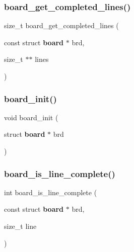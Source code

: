 \mbox{\label{board_8c_a7e412d165de7cbf6c668a1e8202bb15a}} 
\subsubsection{board\+\_\+get\+\_\+completed\+\_\+lines()}
{\footnotesize\ttfamily size\+\_\+t board\+\_\+get\+\_\+completed\+\_\+lines (\begin{DoxyParamCaption}\item[{const struct \textbf{ board} $\ast$}]{brd,  }\item[{size\+\_\+t $\ast$$\ast$}]{lines }\end{DoxyParamCaption})\hspace{0.3cm}{\ttfamily [inline]}}

\mbox{\label{board_8c_ad0ed1aa92b6d55bfcf82c5ffa2306c8c}} 
\subsubsection{board\+\_\+init()}
{\footnotesize\ttfamily void board\+\_\+init (\begin{DoxyParamCaption}\item[{struct \textbf{ board} $\ast$}]{brd }\end{DoxyParamCaption})\hspace{0.3cm}{\ttfamily [inline]}}

\mbox{\label{board_8c_a6660f858472cab9be47a59241f4d20b3}} 
\subsubsection{board\+\_\+is\+\_\+line\+\_\+complete()}
{\footnotesize\ttfamily int board\+\_\+is\+\_\+line\+\_\+complete (\begin{DoxyParamCaption}\item[{const struct \textbf{ board} $\ast$}]{brd,  }\item[{size\+\_\+t}]{line }\end{DoxyParamCaption})\hspace{0.3cm}{\ttfamily [inline]}}

